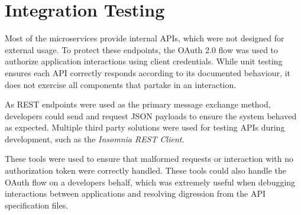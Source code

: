 \section{Integration Testing}
\par
Most of the microservices provide internal APIs, which were not designed for external usage. To protect these endpoints, the OAuth 2.0 flow was used to authorize application interactions using client credentials. While unit testing ensures each API correctly responds according to its documented behaviour, it does not exercise all components that partake in an interaction.

\par
As REST endpoints were used as the primary message exchange method, developers could send and request JSON payloads to ensure the system behaved as expected. Multiple third party solutions were used for testing APIs during development, such as the \textit{Insomnia REST Client}\cite{insomnia}.

\par
These tools were used to ensure that malformed requests or interaction with no authorization token were correctly handled. These tools could also handle the OAuth flow on a developers behalf, which was extremely useful when debugging interactions between applications and resolving digression from the API specification files.
